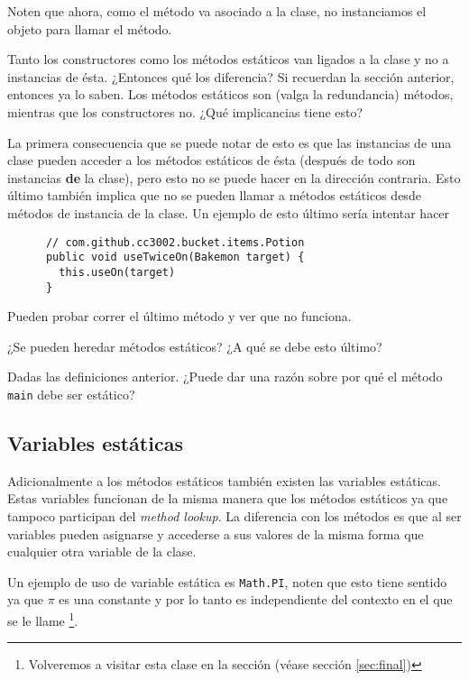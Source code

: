     Noten que ahora, como el método va asociado a la clase, no instanciamos el objeto para llamar el
    método.
    
    Tanto los constructores como los métodos estáticos van ligados a la clase y no a instancias de
    ésta.
    ¿Entonces qué los diferencia?
    Si recuerdan la sección anterior, entonces ya lo saben.
    Los métodos estáticos son (valga la redundancia) métodos, mientras que los constructores no.
    ¿Qué implicancias tiene esto?

    La primera consecuencia que se puede notar de esto es que las instancias de una clase pueden
    acceder a los métodos estáticos de ésta (después de todo son instancias \textbf{de} la clase),
    pero esto no se puede hacer en la dirección contraria.
    Esto último también implica que no se pueden llamar a métodos estáticos desde métodos de 
    instancia de la clase.
    Un ejemplo de esto último sería intentar hacer
    
    \begin{verbatim}
      // com.github.cc3002.bucket.items.Potion
      public void useTwiceOn(Bakemon target) {
        this.useOn(target)
      }
    \end{verbatim}

    Pueden probar correr el último método y ver que no funciona.

    \begin{exercise}
      ¿Se pueden heredar métodos estáticos?
      ¿A qué se debe esto último?
    \end{exercise}
    
    \begin{exercise}
      Dadas las definiciones anterior. 
      ¿Puede dar una razón sobre por qué el método \texttt{main} debe ser estático?
    \end{exercise}
  \subsection{Variables estáticas}
    Adicionalmente a los métodos estáticos también existen las variables estáticas.
    Estas variables funcionan de la misma manera que los métodos estáticos ya que tampoco participan
    del \textit{method lookup}.
    La diferencia con los métodos es que al ser variables pueden asignarse y accederse a sus valores
    de la misma forma que cualquier otra variable de la clase.

    Un ejemplo de uso de variable estática es \texttt{Math.PI}, noten que esto tiene sentido ya que
    \(\pi\) es una constante y por lo tanto es independiente del contexto en el que se le llame 
    \footnote{Volveremos a visitar esta clase en la sección (véase sección \ref{sec:final})}.


